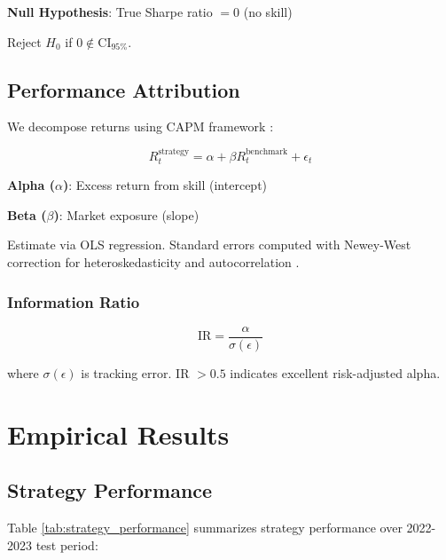 \documentclass[12pt,a4paper]{article}
\begin{document}
\textbf{Null Hypothesis}: True Sharpe ratio $= 0$ (no skill)

Reject $H_0$ if $0 \notin \text{CI}_{95\%}$.

\subsection{Performance Attribution}

We decompose returns using CAPM framework \citep{sharpe1964capital}:

\begin{equation}
R_{t}^{\text{strategy}} = \alpha + \beta R_t^{\text{benchmark}} + \epsilon_t
\end{equation}

\textbf{Alpha ($\alpha$)}: Excess return from skill (intercept)

\textbf{Beta ($\beta$)}: Market exposure (slope)

Estimate via OLS regression. Standard errors computed with Newey-West correction for heteroskedasticity and autocorrelation \citep{newey1987simple}.

\subsubsection{Information Ratio}

\begin{equation}
\text{IR} = \frac{\alpha}{\sigma(\epsilon)}
\end{equation}

where $\sigma(\epsilon)$ is tracking error. IR $> 0.5$ indicates excellent risk-adjusted alpha.

\section{Empirical Results}

\subsection{Strategy Performance}

Table \ref{tab:strategy_performance} summarizes strategy performance over 2022-2023 test period:
\end{document}
